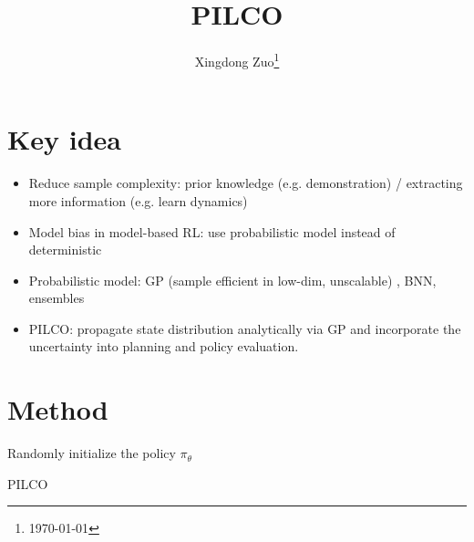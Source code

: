 \documentclass{article}
\title{PILCO}
\author{
    Xingdong Zuo\thanks{\today} \\
}
\begin{document}
\maketitle

\section{Key idea}
\begin{itemize}
    \item Reduce sample complexity: prior knowledge (e.g. demonstration) / extracting more information (e.g. learn dynamics)
    \item Model bias in model-based RL: use probabilistic model instead of deterministic
    \item Probabilistic model: GP (sample efficient in low-dim, unscalable) , BNN, ensembles
    \item PILCO: propagate state distribution analytically via GP and incorporate the uncertainty into planning and policy evaluation. 
\end{itemize}

\section{Method}

\begin{algorithm}[H]
    \SetAlgoNoLine
    Randomly initialize the policy $\pi_\theta$ \\
    \caption{PILCO \cite{deisenroth2011pilco}}
    \label{algo:pilco}
\end{algorithm}
\end{document}

